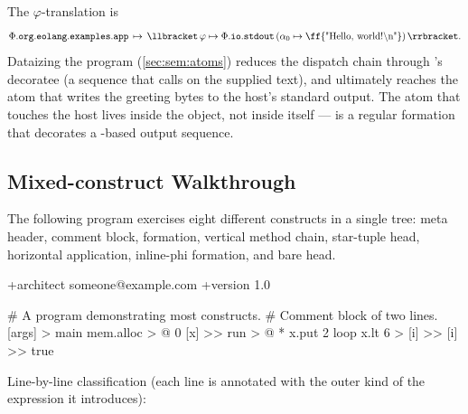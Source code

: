 The \(\varphi\)-translation is
\begin{equation*}
  \Phi.\mathtt{org}.\mathtt{eolang}.\mathtt{examples}.\mathtt{app}\,\mapsto\,
    \llbracket\,
      \varphi \mapsto \Phi.\mathtt{io}.\mathtt{stdout}\,(\alpha_0 \mapsto \text{\ff{"Hello, world!\textbackslash n"}})
    \,\rrbracket.
\end{equation*}
Dataizing the program (\cref{sec:sem:atoms}) reduces the dispatch chain
  through 's decoratee (a sequence that calls
   on the supplied text), and ultimately reaches the
  atom that writes the greeting bytes to the host's standard output.
The atom that touches the host lives inside the  object,
  not inside  itself ---  is a regular
  formation that decorates a -based output sequence.

\subsection{Mixed-construct Walkthrough}\label{app:ex:mixed}

The following program exercises eight different constructs in a single
  tree: meta header, comment block, formation, vertical method chain,
  star-tuple head, horizontal application, inline-phi formation, and
  bare head.

\begin{ffcode}
+architect someone@example.com
+version 1.0

# A program demonstrating most constructs.
# Comment block of two lines.
[args] > main
  mem.alloc > @
    0
    [x] >>
      run > @
        *
          x.put 2
          loop
            x.lt 6 > [i] >>
            [i] >>
              true
\end{ffcode}

Line-by-line classification (each line is annotated with the outer kind of
  the expression it introduces):

